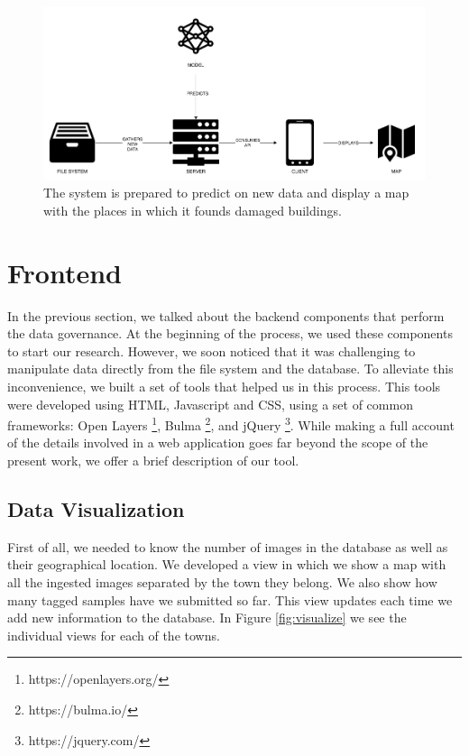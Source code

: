 \begin{figure}[h]
  \centering
  \includegraphics[width=1\textwidth]{images/predict-diagram.png}
  \caption{The system is prepared to predict on new data and display a map with the places in which it founds damaged buildings.}
  \label{fig:predict}
\end{figure}

\section{Frontend}

In the previous section, we talked about the backend components that perform the data governance. At the beginning of the process, we used these components to start our research. However, we soon noticed that it was challenging to manipulate data directly from the file system and the database. To alleviate this inconvenience, we built a set of tools that helped us in this process. This tools were developed using HTML, Javascript and CSS, using a set of common frameworks: Open Layers \footnote{https://openlayers.org/}, Bulma \footnote{https://bulma.io/}, and jQuery \footnote{https://jquery.com/}. While making a full account of the details involved in a web application goes far beyond the scope of the present work, we offer a brief description of our tool.\\

\subsection{Data Visualization}

First of all, we needed to know the number of images in the database as well as their geographical location. We developed a view in which we show a map with all the ingested images separated by the town they belong. We also show how many tagged samples have we submitted so far. This view updates each time we add new information to the database. In Figure \ref{fig:visualize} we see the individual views for each of the towns.\\


